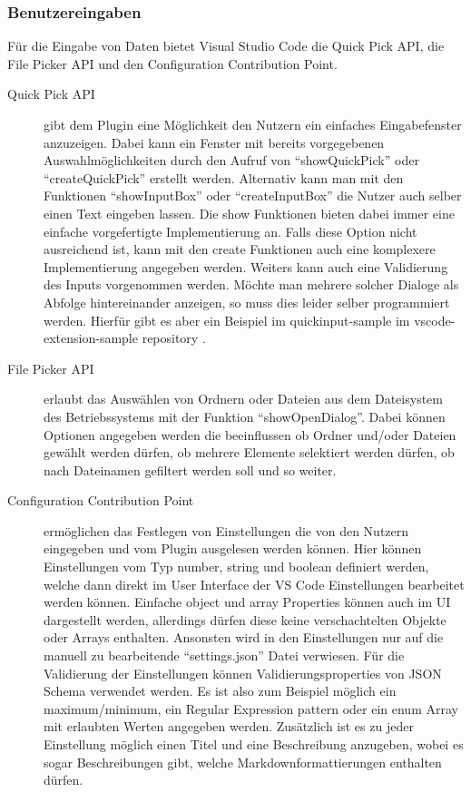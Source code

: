 \subsubsection{Benutzereingaben}
  Für die Eingabe von Daten bietet Visual Studio Code die Quick Pick API, die File Picker API
  und den Configuration Contribution Point.
  \begin{description}
    \item[Quick Pick API] gibt dem Plugin eine Möglichkeit den Nutzern ein einfaches Eingabefenster
      anzuzeigen. Dabei kann ein Fenster mit bereits vorgegebenen Auswahlmöglichkeiten durch
      den Aufruf von \enquote{showQuickPick} oder \enquote{createQuickPick} erstellt werden.
      Alternativ kann man mit den Funktionen \enquote{showInputBox} oder \enquote{createInputBox}
      die Nutzer auch selber einen Text eingeben lassen. Die show Funktionen bieten dabei immer
      eine einfache vorgefertigte Implementierung an. Falls diese Option nicht ausreichend ist,
      kann mit den create Funktionen auch eine komplexere Implementierung angegeben werden.
      Weiters kann auch eine Validierung des Inputs vorgenommen werden.
      Möchte man mehrere solcher Dialoge als Abfolge hintereinander anzeigen, so muss dies leider
      selber programmiert werden. Hierfür gibt es aber ein Beispiel im quickinput-sample
      im vscode-extension-sample repository \cite{VSCodeExtensionSamples}. 
    \item[File Picker API] erlaubt das Auswählen von Ordnern oder Dateien aus dem Dateisystem
      des Betriebssystems mit der Funktion \enquote{showOpenDialog}. Dabei können Optionen angegeben
      werden die beeinflussen ob Ordner und/oder Dateien gewählt werden dürfen, ob mehrere Elemente
      selektiert werden dürfen, ob nach Dateinamen gefiltert werden soll und so weiter.
    \item[Configuration Contribution Point] ermöglichen das Festlegen von Einstellungen
      die von den Nutzern eingegeben und vom Plugin ausgelesen werden können. Hier können
      Einstellungen vom Typ number, string und boolean definiert werden, welche dann direkt
      im User Interface der VS Code Einstellungen bearbeitet werden können.
      Einfache object und array Properties können auch im UI dargestellt werden,
      allerdings dürfen diese keine verschachtelten Objekte oder Arrays enthalten.
      Ansonsten wird in den Einstellungen nur auf die manuell zu bearbeitende 
      \enquote{settings.json} Datei verwiesen.
      Für die Validierung der Einstellungen können Validierungsproperties
      von JSON Schema verwendet werden. Es ist also zum Beispiel möglich
      ein maximum/minimum, ein Regular Expression pattern oder ein enum Array
      mit erlaubten Werten angegeben werden.
      Zusätzlich ist es zu jeder Einstellung möglich einen Titel und eine Beschreibung
      anzugeben, wobei es sogar Beschreibungen gibt, welche Markdownformattierungen
      enthalten dürfen.
  \end{description}
